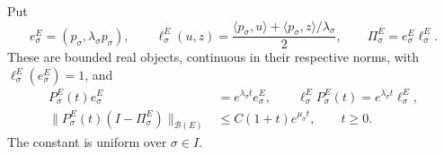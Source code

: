 \begin{proposition}\label{P:compact-E-wave}
  Put
  \[
    e_\sigma^E=(p_\sigma,\lambda_\sigma p_\sigma),\qquad
    \ell_\sigma^E(u,z)
    =\frac{\langle p_\sigma,u\rangle+
    \langle p_\sigma,z\rangle/\lambda_\sigma}{2},
    \qquad \Pi_\sigma^E=e_\sigma^E\ell_\sigma^E.
  \]
  These are bounded real objects, continuous in their respective norms, with
  $\ell_\sigma^E(e_\sigma^E) = 1$, and
  \begin{align}
    P_\sigma^E(t)e_\sigma^E
    &=e^{\lambda_\sigma t}e_\sigma^E,\qquad
    \ell_\sigma^EP_\sigma^E(t)
    =e^{\lambda_\sigma t}\ell_\sigma^E,\label{E:compact-E-eigen}\\
    \|P_\sigma^E(t)(I-\Pi_\sigma^E)\|_{\mathcal{B}(E)}
    &\le C(1+t)e^{\mu_\sigma t},\qquad t\ge0.
    \label{E:compact-E-complement}
  \end{align}
  The constant is uniform over $\sigma \in I$.
\end{proposition}

